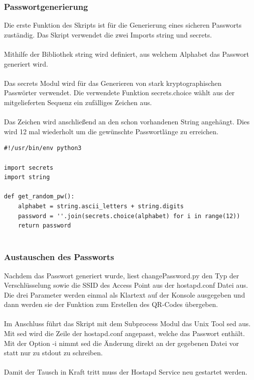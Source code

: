 \documentclass[a4paper,11pt,singlespacing]{article}
\begin{document}
    	\subsubsection{Passwortgenerierung}
    		Die erste Funktion des Skripts ist für die Generierung eines sicheren Passworts zuständig. Das Skript verwendet die zwei Imports string und secrets. \\ \\
    		Mithilfe der Bibliothek string wird definiert, aus welchem Alphabet das Passwort generiert wird.\\ \\			
    		Das secrets Modul wird für das Generieren von stark kryptographischen Passwörter verwendet. Die verwendete Funktion secrets.choice wählt aus der mitgelieferten Sequenz ein zufälliges Zeichen aus. \\ \\
    		Das Zeichen wird anschließend an den schon vorhandenen String angehängt. Dies wird 12 mal wiederholt um die gewünschte Passwortlänge zu erreichen.
    	
    	

\begin{lstlisting}            
#!/usr/bin/env python3

import secrets
import string

def get_random_pw():
	alphabet = string.ascii_letters + string.digits
	password = ''.join(secrets.choice(alphabet) for i in range(12))
	return password
	
\end{lstlisting}
    	
    	\subsubsection{Austauschen des Passworts}
    		Nachdem das Passwort generiert wurde, liest changePassword.py den Typ der Verschlüsselung sowie die SSID des Access Point aus der hostapd.conf Datei aus. Die drei Parameter werden einmal als Klartext auf der Konsole ausgegeben und dann werden sie der Funktion zum Erstellen des QR-Codes übergeben. \\ \\
    		Im Anschluss führt das Skript mit dem Subprocess Modul das Unix Tool sed aus. Mit sed wird die Zeile der hostapd.conf angepasst, welche das Passwort enthält. Mit der Option -i nimmt sed die Änderung direkt an der gegebenen Datei vor statt nur zu stdout zu schreiben. \\ \\
    		Damit der Tausch in Kraft tritt muss der Hostapd Service neu gestartet werden. \\ \\
   
\end{document}
